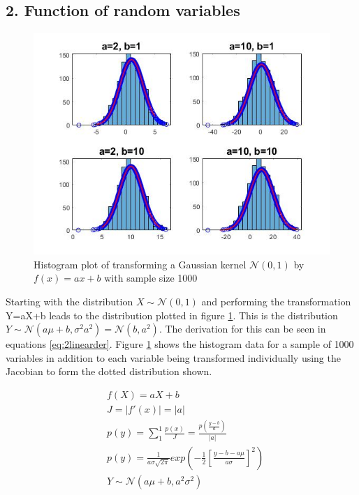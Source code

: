 \documentclass[twoside,twocolumn]{article}
\begin{document}
\subsection{2. Function of random variables}
\begin{figure}[h]
  \centering
    \includegraphics[width=\linewidth]{2linear}
  \caption{Histogram plot of transforming a Gaussian kernel $\mathcal{N}(0,1)$ by $f(x)=ax+b$ with sample size 1000}
  \label{fig:2linear}
\end{figure}

Starting with the distribution $X\sim\mathcal{N}(0,1)$ and performing the transformation Y=aX+b leads to the distribution plotted in figure \ref{fig:2linear}. This is the distribution $Y\sim\mathcal{N}(a\mu+b,\sigma^2a^2)=\mathcal{N}(b,a^2)$. The derivation for this can be seen in equations \ref{eq:2linearder}. Figure \ref{fig:2linear} shows the histogram data for a sample of 1000 variables in addition to each variable being transformed individually using the Jacobian to form the dotted distribution shown. 

\begin{equation}
\label{eq:2linearder}
\begin{split}
&f(X)=aX+b\\
&J=|f'(x)|=|a|\\
&p(y) = \sum_{1}^{1} \frac{p(x)}{J} = \frac{p(\frac{y-b}{a})}{|a|} \\
&p(y)=\frac{1}{a\sigma\sqrt{2\pi}}exp(-\frac{1}{2}[\frac{y-b-a\mu}{a\sigma}]^2)\\
&Y\sim\mathcal{N}(a\mu+b,a^2\sigma^2)\\
\end{split}
\end{equation} 
\end{document}
